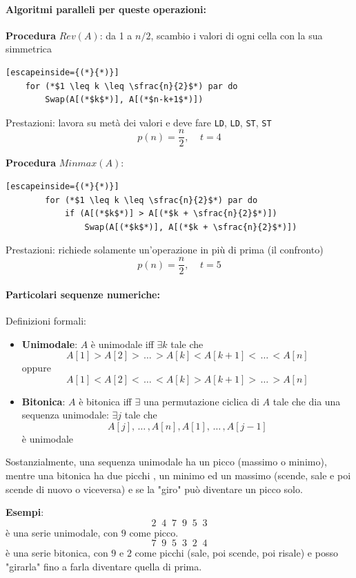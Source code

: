 \documentclass[11pt]{article}
\begin{document}
	\newpage
	
	
	\paragraph{Algoritmi paralleli per queste operazioni: }
	\item \textbf{Procedura} $Rev(A)$: da 1 a $n/2$, scambio i valori di ogni cella con la sua simmetrica
	\begin{lstlisting}[escapeinside={(*}{*)}]
	for (*$1 \leq k \leq \sfrac{n}{2}$*) par do
		Swap(A[(*$k$*)], A[(*$n-k+1$*)])
	\end{lstlisting}
	Prestazioni: lavora su metà dei valori e deve fare \texttt{LD}, \texttt{LD}, \texttt{ST}, \texttt{ST}
	$$ p(n) = \frac{n}{2}, \;\;\;\; t = 4 $$
	
	\item \textbf{Procedura} $Minmax(A)$:
	\begin{lstlisting}[escapeinside={(*}{*)}]
		for (*$1 \leq k \leq \sfrac{n}{2}$*) par do
			if (A[(*$k$*)] > A[(*$k + \sfrac{n}{2}$*)])
				Swap(A[(*$k$*)], A[(*$k + \sfrac{n}{2}$*)])
	\end{lstlisting}
	Prestazioni: richiede solamente un'operazione in più di prima (il confronto)
	$$ p(n) = \frac{n}{2}, \;\;\;\; t = 5 $$
	
	\paragraph{Particolari sequenze numeriche:} Definizioni formali: 
	\begin{itemize}
		\item \textbf{Unimodale}: $A$ è unimodale iff $\exists k$ tale che 
		$$ A[1] > A[2] > \, \dots \, > A[k] < A[k+1] < \, \dots \, < A[n] $$
		oppure 
		$$ A[1] < A[2] < \, \dots \, < A[k] > A[k+1] > \, \dots \, > A[n] $$
		
		\item \textbf{Bitonica}: $A$ è bitonica iff $\exists$ una permutazione ciclica di $A$ tale che dia una sequenza unimodale: $\exists j$ tale che
		$$ A[j], \, \dots \, , A[n], A[1], \, \dots \, , A[j-1] $$ 
		è unimodale
	\end{itemize}
	Sostanzialmente, una sequenza unimodale ha un picco (massimo o minimo), mentre una bitonica ha due picchi , un minimo ed un massimo (scende, sale e poi scende di nuovo o viceversa) e se la "giro" può diventare un picco solo. \\
	
	\newpage
	
	\textbf{Esempi}: 
	$$ 2 \;\; 4 \;\; 7 \;\; 9 \;\; 5 \;\; 3 $$
	è una serie unimodale, con $9$ come picco.\\
	
	$$ 7 \;\; 9 \;\; 5 \;\; 3 \;\; 2 \;\; 4 $$
	è una serie bitonica, con $9$ e $2$ come picchi (sale, poi scende, poi risale) e posso "girarla" fino a farla diventare quella di prima.\\
	
	
\end{document}
